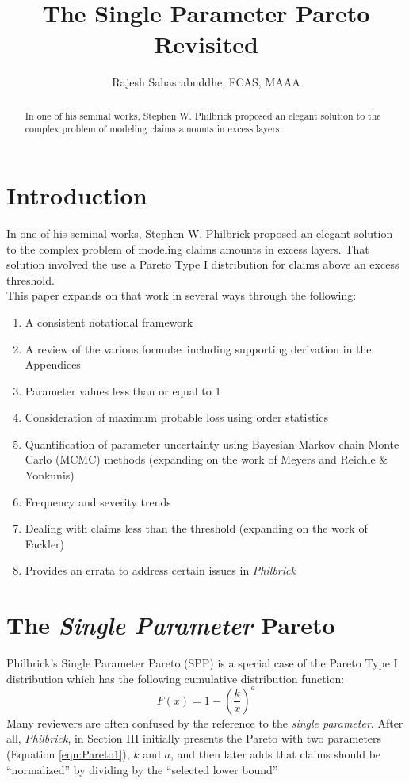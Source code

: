 \documentclass[]{article} %
\title{The Single Parameter Pareto Revisited}
\author{Rajesh Sahasrabuddhe, FCAS, MAAA}
\newcommand{\philbrick}{\textit{Philbrick}}
\begin{document}
\maketitle

\begin{abstract}
In one of his seminal works, Stephen W. Philbrick proposed an elegant solution to the complex problem of modeling claims amounts in excess layers. 

\end{abstract}

\section{Introduction}
In one of his seminal works, Stephen W. Philbrick\cite{Philbrick} proposed an elegant solution to the complex problem of modeling claims amounts in excess layers. That solution involved the use a Pareto Type I distribution for claims above an excess threshold.\\

This paper expands on that work in several ways through the following:
\begin{enumerate}
	\item A consistent notational framework
	\item A review of the various formul\ae~including supporting derivation in the Appendices
	\item Parameter values less than or equal to 1
	\item Consideration of maximum probable loss using order statistics
	\item Quantification of parameter uncertainty using Bayesian Markov chain Monte Carlo (MCMC) methods (expanding on the work of Meyers and Reichle \& Yonkunis)
	\item Frequency and severity trends
	\item Dealing with claims less than the threshold (expanding on the work of Fackler)
	\item Provides an errata to address certain issues in \philbrick
\end{enumerate}
\section{The \emph{Single Parameter} Pareto}\label{sec:theSPP}
Philbrick's Single Parameter Pareto (SPP) is a special case of the Pareto Type I distribution which has the following cumulative distribution function:
\begin{equation}
F(x) = 1 - \left(\frac{k}{x} \right)^a\label{eqn:Pareto1}
\end{equation}
Many reviewers are often confused by the reference to the \emph{single parameter}. After all, \philbrick, in Section III initially presents the Pareto with two parameters (Equation \ref{eqn:Pareto1}), $k$ and $a$, and then later adds that claims should be ``normalized'' by dividing by the ``selected lower bound''
\end{document}
